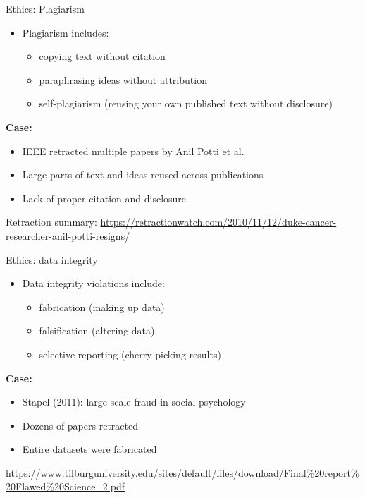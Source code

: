 \documentclass[aspectratio=169]{beamer}
\begin{document}
\begin{frame}{Ethics: Plagiarism}
  \begin{itemize}
    \item Plagiarism includes:
      \begin{itemize}
        \item copying text without citation
        \item paraphrasing ideas without attribution
        \item self-plagiarism (reusing your own published text without disclosure)
      \end{itemize}
  \end{itemize}

  \vspace{0.5em}
  \textbf{Case:}
  \begin{itemize}
    \item IEEE retracted multiple papers by Anil Potti et al.
    \item Large parts of text and ideas reused across publications
    \item Lack of proper citation and disclosure
  \end{itemize}

  \vspace{0.3em}
  \tiny
  Retraction summary: \url{https://retractionwatch.com/2010/11/12/duke-cancer-researcher-anil-potti-resigns/}

  \vspace{0.5em}
  
\end{frame}
\begin{frame}{Ethics: data integrity}
  \begin{itemize}
    \item Data integrity violations include:
      \begin{itemize}
        \item fabrication (making up data)
        \item falsification (altering data)
        \item selective reporting (cherry-picking results)
      \end{itemize}
  \end{itemize}

  \vspace{0.5em}
  \textbf{Case:}
  \begin{itemize}
    \item Stapel (2011): large-scale fraud in social psychology
    \item Dozens of papers retracted
    \item Entire datasets were fabricated
  \end{itemize}

  \vspace{0.3em}
  \tiny
 \tiny
\url{https://www.tilburguniversity.edu/sites/default/files/download/Final\%20report\%20Flawed\%20Science\_2.pdf}
  \end{frame}
\end{document}
